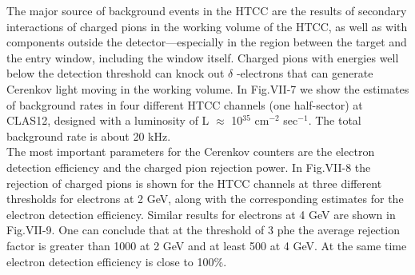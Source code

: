 \indent The major source of background events in the HTCC are the results of secondary interactions of charged pions in the working volume of the HTCC, as well as with components outside the detector---especially in the region between the target and the entry window, including the window itself. Charged pions with energies well below the detection threshold can knock out $\delta$ -electrons that can generate Cerenkov light moving in the working volume. In Fig.VII-7 we show the estimates of background rates in four different HTCC channels (one half-sector) at CLAS12, designed with a luminosity of L $\approx$ 10$^{35}$ cm$^{-2}$ sec$^{-1}$. The total background rate is about 20 kHz. \\
\indent The most important parameters for the Cerenkov counters are the electron detection efficiency and the charged pion rejection power. In Fig.VII-8 the rejection of charged pions is shown for the HTCC channels at three different thresholds for electrons at 2 GeV, along with the corresponding estimates for the electron detection efficiency. Similar results for electrons at 4 GeV are shown in Fig.VII-9. One can conclude that at the threshold of 3 phe the average rejection factor is greater than 1000 at 2 GeV and at least 500 at 4 GeV. At the same time electron detection efficiency is close to 100\%.
